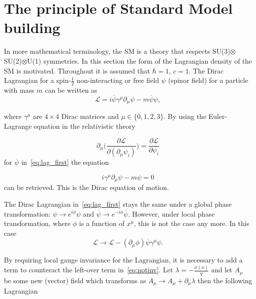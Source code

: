 \section{The principle of Standard Model building}
\label{build}
In more mathematical terminology, the \gls{SM} is a theory that respects SU(3)$\otimes$SU(2)$\otimes$U(1) symmetries. In this section the form of the Lagrangian density of the \gls{SM} is motivated. Throughout it is assumed that $\hbar=1$, $c=1$. The Dirac Lagrangian for a spin-$\frac{1}{2}$ non-interacting or free field $\psi$ (spinor field) for a particle with mass $m$ can be written as 
\begin{equation}
\mathcal{L} = i\overline{\psi}\gamma^{\mu}\partial_{\mu}\psi - m\overline{\psi}\psi,
\label{eq:lag_first}
\end{equation}

\noindent where $\gamma^{\mu}$ are $4\times 4$ Dirac matrices and $\mu\in\{0,1,2,3\}$. By using the Euler-Lagrange equation in the relativistic theory

\begin{equation}
	\partial_{\mu}\Big(\frac{\partial{\mathcal{L}}}{\partial(\partial_{\mu}\psi_{i})} \Big) =\frac{\partial \mathcal{L}}{\partial\psi_{i}}
\label{eq:lag_first}
\end{equation}
for $\overline\psi$ in~\autoref{eq:lag_first} the equation 

\begin{equation}
 i\gamma^{\mu}\partial_{\mu}\psi - m\psi = 0
\label{eq:lag_first2}
\end{equation}
can be retrieved. This is the Dirac equation of motion.

The Dirac Lagrangian in~\autoref{eq:lag_first} stays the same under a global phase transformation: $\psi \rightarrow e^{i\phi}\psi$ and $\overline\psi \rightarrow e^{-i\phi}\overline\psi$. However, under local phase transformation, where $\phi$ is a function of $x^{\mu}$, this is not the case any more. In this case
\begin{equation}
\mathcal{L} \rightarrow \mathcal{L}- (\partial_{\mu}\phi) \overline{\psi}\gamma^{\mu}\psi.
\label{eq:notinv}
\end{equation}

By requiring local gauge invariance for the Lagrangian, it is necessary to add a term to counteract the left-over term in~\autoref{eq:notinv}. Let $\lambda=-\frac{\phi(x)}{q}$ and let $A_{\mu}$ be some new (vector) field which transforms as $A_{\mu} \rightarrow A_{\mu} + \partial_{\mu}\lambda$ then the following Lagrangian

